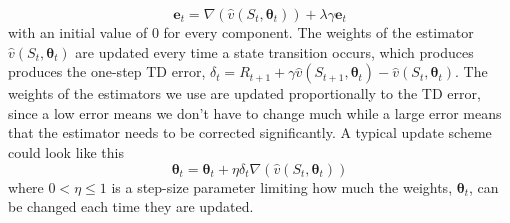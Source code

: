 \documentclass[11pt]{article}
\begin{document}
\begin{equation}
    \mathbf{e}_t = \nabla(\hat{v}(S_t, \mathbf{\theta}_t)) + \lambda  \gamma  \mathbf{e}_t
\end{equation}
with an initial value of 0 for every component.
The weights of the estimator $\hat{v}(S_t, \mathbf{\theta}_t)$ are
updated every time a state transition occurs, which produces
produces the one-step TD error, $\delta_t = R_{t+1} + \gamma  \hat{v}(S_{t+1}, \mathbf{\theta}_t) - \hat{v}(S_t, \mathbf{\theta}_t)$.
The weights of the estimators we use are updated proportionally to the TD error, since
a low error means we don't have to change much while a large error means that
the estimator needs to be corrected significantly.
A typical update scheme could look like this
\begin{equation}
    \mathbf{\theta}_t = \mathbf{\theta}_t + \eta  \delta_t  \nabla(\hat{v}(S_t, \mathbf{\theta}_t))
\end{equation}
where $0 < \eta \leq 1$ is a step-size parameter limiting how much the weights,
$\mathbf{\theta}_t$, can be changed each time they are updated.
\end{document}
